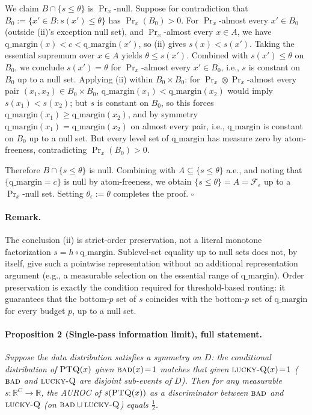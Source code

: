 \documentclass{article}
\newcommand{\ptq}{\textsc{PTQ}\xspace}
\newcommand{\bad}{\textsc{bad}\xspace}
\newcommand{\luckyq}{\textsc{lucky-Q}\xspace}
\begin{document}
We claim $B \cap \{s \leq \theta\}$ is $\Pr_x$-null. Suppose for contradiction that $B_0 := \{x' \in B : s(x') \leq \theta\}$ has $\Pr_x(B_0) > 0$. For $\Pr_x$-almost every $x' \in B_0$ (outside (ii)'s exception null set), and $\Pr_x$-almost every $x \in A$, we have $\mathrm{q\_margin}(x) < c < \mathrm{q\_margin}(x')$, so (ii) gives $s(x) < s(x')$. Taking the essential supremum over $x \in A$ yields $\theta \leq s(x')$. Combined with $s(x') \leq \theta$ on $B_0$, we conclude $s(x') = \theta$ for $\Pr_x$-almost every $x' \in B_0$, i.e., $s$ is constant on $B_0$ up to a null set. Applying (ii) within $B_0 \times B_0$: for $\Pr_x \otimes \Pr_x$-almost every pair $(x_1, x_2) \in B_0 \times B_0$, $\mathrm{q\_margin}(x_1) < \mathrm{q\_margin}(x_2)$ would imply $s(x_1) < s(x_2)$; but $s$ is constant on $B_0$, so this forces $\mathrm{q\_margin}(x_1) \geq \mathrm{q\_margin}(x_2)$, and by symmetry $\mathrm{q\_margin}(x_1) = \mathrm{q\_margin}(x_2)$ on almost every pair, i.e., $\mathrm{q\_margin}$ is constant on $B_0$ up to a null set. But every level set of $\mathrm{q\_margin}$ has measure zero by atom-freeness, contradicting $\Pr_x(B_0) > 0$.

Therefore $B \cap \{s \leq \theta\}$ is null. Combining with $A \subseteq \{s \leq \theta\}$ a.e., and noting that $\{\mathrm{q\_margin} = c\}$ is null by atom-freeness, we obtain $\{s \leq \theta\} = A = \mathcal F_\epsilon$ up to a $\Pr_x$-null set. Setting $\theta_\epsilon := \theta$ completes the proof. \hfill$\square$

\paragraph{Remark.}
The conclusion (ii) is strict-order preservation, not a literal monotone factorization $s = h \circ \mathrm{q\_margin}$. Sublevel-set equality up to null sets does not, by itself, give such a pointwise representation without an additional representation argument (e.g., a measurable selection on the essential range of $\mathrm{q\_margin}$). Order preservation is exactly the condition required for threshold-based routing: it guarantees that the bottom-$p$ set of $s$ coincides with the bottom-$p$ set of $\mathrm{q\_margin}$ for every budget $p$, up to a null set.

\paragraph{Proposition 2 (Single-pass information limit), full statement.}
\emph{Suppose the data distribution satisfies a symmetry on $D$: the conditional distribution of $\ptq(x)$ given $\bad(x)\!=\!1$ matches that given $\luckyq(x)\!=\!1$ ($\bad$ and $\luckyq$ are disjoint sub-events of $D$). Then for any measurable $s: \mathbb R^C \to \mathbb R$, the AUROC of $s(\ptq(x))$ as a discriminator between $\bad$ and $\luckyq$ (on $\bad \cup \luckyq$) equals $\tfrac12$.}
\end{document}
